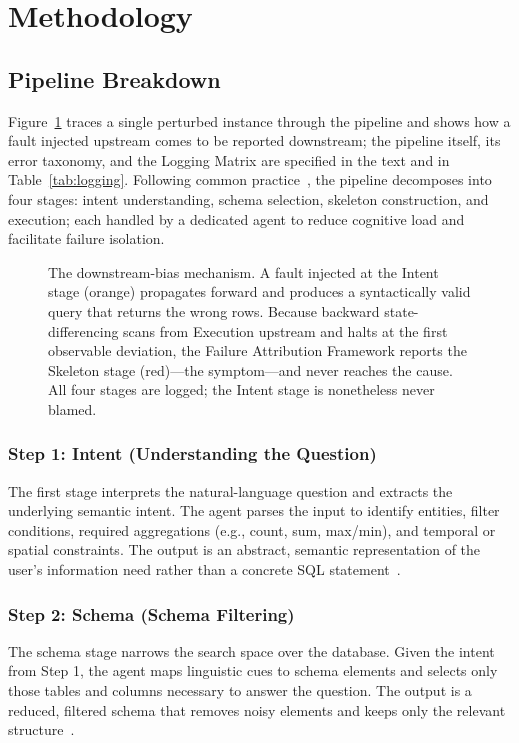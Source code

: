 \documentclass[conference]{IEEEtran}
\begin{document}
\section{Methodology}
\label{sec:methodology}

\subsection{Pipeline Breakdown}
Figure~\ref{fig:running_example} traces a single perturbed instance through the
pipeline and shows how a fault injected upstream comes to be reported
downstream; the pipeline itself, its error taxonomy, and the Logging Matrix are
specified in the text and in Table~\ref{tab:logging}. Following common
practice~\cite{shen_icl_errors_2026}, the pipeline decomposes into four stages: intent understanding, schema selection, skeleton construction, and execution; each handled by a dedicated agent to reduce cognitive load and facilitate failure isolation.

\begin{figure}[htbp]
    \centering
    \resizebox{\columnwidth}{!}{
        
    }
    \caption{The downstream-bias mechanism. A fault injected at the Intent
    stage (orange) propagates forward and produces a syntactically valid
    query that returns the wrong rows. Because backward state-differencing
    scans from Execution upstream and halts at the first observable
    deviation, the Failure Attribution Framework reports the Skeleton stage
    (red)---the symptom---and never reaches the cause. All four stages are
    logged; the Intent stage is nonetheless never blamed.}
    \label{fig:running_example}
\end{figure}


\subsubsection{Step 1: Intent (Understanding the Question)}
The first stage interprets the natural-language question and extracts the
underlying semantic intent. The agent parses the input to identify entities,
filter conditions, required aggregations (e.g., count, sum, max/min), and
temporal or spatial constraints. The output is an abstract, semantic
representation of the user's information need rather than a concrete SQL
statement~\cite{shen_icl_errors_2026}.

\subsubsection{Step 2: Schema (Schema Filtering)}
The schema stage narrows the search space over the database. Given the
intent from Step 1, the agent maps linguistic cues to schema elements and
selects only those tables and columns necessary to answer the question. The
output is a reduced, filtered schema that removes noisy elements and keeps
only the relevant structure~\cite{yang_sql_to_schema_2024}.
\end{document}
